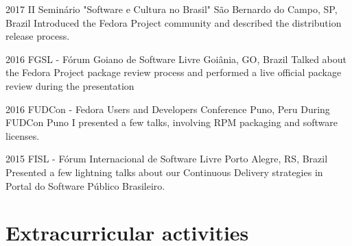 \documentclass[]{friggeri-cv} %
\begin{document}
\begin{entrylist}


\entry
{2017}
{II Seminário "Software e Cultura no Brasil"}
{São Bernardo do Campo, SP, Brazil}
{Introduced the Fedora Project community and described the distribution release process.}


\entry
{2016}
{FGSL - Fórum Goiano de Software Livre}
{Goiânia, GO, Brazil}
{Talked about the Fedora Project package review process and performed a live official package review during the presentation}

\entry
{2016}
{FUDCon - Fedora Users and Developers Conference}
{Puno, Peru}
{During FUDCon Puno I presented a few talks, involving RPM packaging and software licenses.}


\entry
{2015}
{FISL - Fórum Internacional de Software Livre}
{Porto Alegre, RS, Brazil}
{Presented a few lightning talks about our Continuous Delivery strategies in
  Portal do Software Público Brasileiro.}


\end{entrylist}


\section{Extracurricular activities}
\end{document}
